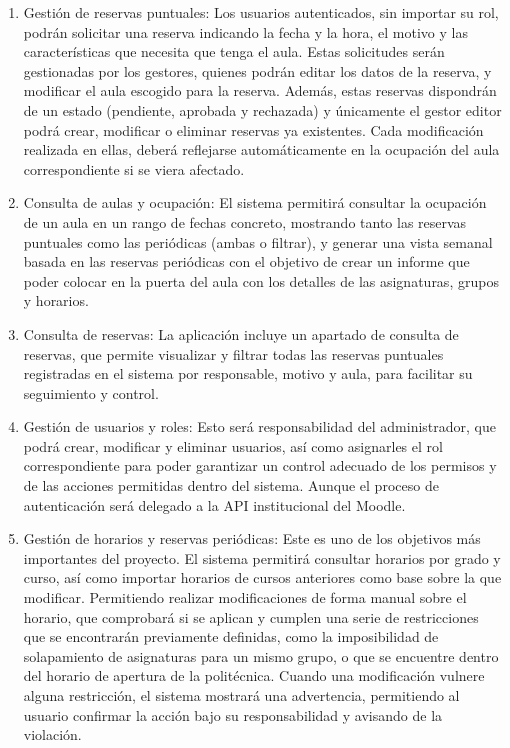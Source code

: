 \begin{enumerate}
	\item Gestión de reservas puntuales: Los usuarios autenticados, sin importar su rol, podrán solicitar una reserva indicando la fecha y la hora, el motivo y las características que necesita que tenga el aula. Estas solicitudes serán gestionadas por los gestores, quienes podrán editar los datos de la reserva, y modificar el aula escogido para la reserva. Además, estas reservas dispondrán de un estado (pendiente, aprobada y rechazada) y únicamente el gestor editor podrá crear, modificar o eliminar reservas ya existentes. Cada modificación realizada en ellas, deberá reflejarse automáticamente en la ocupación del aula correspondiente si se viera afectado.
	\item Consulta de aulas y ocupación: El sistema permitirá consultar la ocupación de un aula en un rango de fechas concreto, mostrando tanto las reservas puntuales como las periódicas (ambas o filtrar), y generar una vista semanal basada en las reservas periódicas con el objetivo de crear un informe que poder colocar en la puerta del aula con los detalles de las asignaturas, grupos y horarios.
	\item Consulta de reservas: La aplicación incluye un apartado de consulta de reservas, que permite visualizar y filtrar todas las reservas puntuales registradas en el sistema por responsable, motivo y aula, para facilitar su seguimiento y control.
	\item Gestión de usuarios y roles: Esto será responsabilidad del administrador, que podrá crear, modificar y eliminar usuarios, así como asignarles el rol correspondiente para poder garantizar un control adecuado de los permisos y de las acciones permitidas dentro del sistema. Aunque el proceso de autenticación será delegado a la API institucional del Moodle.
	\item Gestión de horarios y reservas periódicas: Este es uno de los objetivos más importantes del proyecto. El sistema permitirá consultar horarios por grado y curso, así como importar horarios de cursos anteriores como base sobre la que modificar. Permitiendo realizar modificaciones de forma manual sobre el horario, que comprobará si se aplican y cumplen una serie de restricciones que se encontrarán previamente definidas, como la imposibilidad de solapamiento de asignaturas para un mismo grupo, o que se encuentre dentro del horario de apertura de la politécnica. Cuando una modificación vulnere alguna restricción, el sistema mostrará una advertencia, permitiendo al usuario confirmar la acción bajo su responsabilidad y avisando de la violación.
\end{enumerate}

